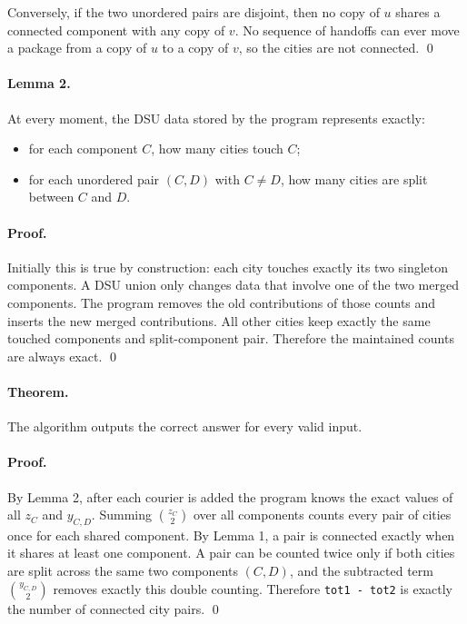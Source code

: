 \documentclass[11pt]{article}
\begin{document}
Conversely, if the two unordered pairs are disjoint, then no copy of $u$ shares a connected component
with any copy of $v$. No sequence of handoffs can ever move a package from a copy of $u$ to a copy of
$v$, so the cities are not connected. \qed

\paragraph{Lemma 2.}
At every moment, the DSU data stored by the program represents exactly:
\begin{itemize}[leftmargin=*]
    \item for each component $C$, how many cities touch $C$;
    \item for each unordered pair $(C,D)$ with $C \ne D$, how many cities are split between $C$ and $D$.
\end{itemize}

\paragraph{Proof.}
Initially this is true by construction: each city touches exactly its two singleton components.
A DSU union only changes data that involve one of the two merged components.
The program removes the old contributions of those counts and inserts the new merged contributions.
All other cities keep exactly the same touched components and split-component pair. Therefore the
maintained counts are always exact. \qed

\paragraph{Theorem.}
The algorithm outputs the correct answer for every valid input.

\paragraph{Proof.}
By Lemma 2, after each courier is added the program knows the exact values of all $z_C$ and $y_{C,D}$.
Summing $\binom{z_C}{2}$ over all components counts every pair of cities once for each shared
component. By Lemma 1, a pair is connected exactly when it shares at least one component.
A pair can be counted twice only if both cities are split across the same two components $(C,D)$, and the
subtracted term $\binom{y_{C,D}}{2}$ removes exactly this double counting.
Therefore \texttt{tot1 - tot2} is exactly the number of connected city pairs. \qed
\end{document}
